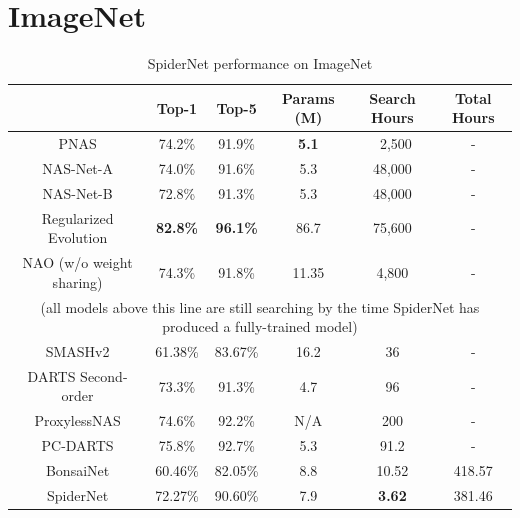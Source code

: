 \section{ImageNet}
\begin{table}[h]
\begin{center}
\begin{tabular}{c|c|c|c|c|c}
 & Top-1 & Top-5 & Params (M) & Search Hours & Total Hours\\
\hline
PNAS                        & 74.2\%                        & 91.9\%            & \textbf{5.1}  & ~2,500        		& - 			\\
NAS-Net-A                   & 74.0\%                        & 91.6\%            & 5.3           & 48,000        		& -			\\
NAS-Net-B                   & 72.8\%                        & 91.3\%            & 5.3           & 48,000        		& -			\\
Regularized Evolution       & \textbf{82.8\%}               & \textbf{96.1\%}   & 86.7          & 75,600        		& -			\\
NAO (w/o weight sharing)    & 74.3\%                        & 91.8\%            & 11.35         & 4,800         		& -			\\
\multicolumn{6}{c}{\scriptsize{(all models above this line are still searching by the time SpiderNet has produced a fully-trained model)}} \\ \hline
SMASHv2                     & 61.38\%                       & 83.67\%           & 16.2          & 36			   		& -			\\
DARTS Second-order     	    & 73.3\%                        & 91.3\%            & 4.7           & 96            		& -			\\
ProxylessNAS                & 74.6\%                        & 92.2\%            & N/A           & 200           		& -			\\
PC-DARTS                    & 75.8\%   	                    & 92.7\%             & 5.3           & 91.2          		& -			\\ \hline
BonsaiNet					& 60.46\%						& 82.05\%			& 8.8			& 10.52					& 418.57   	\\
SpiderNet					& 72.27\%						& 90.60\%			& 7.9			& \textbf{3.62}			& 381.46   	\\
\end{tabular}
\end{center}
\caption[SpiderNet performance on ImageNet]{SpiderNet performance on ImageNet}
\label{tab:spider_imagenet}
\end{table}
